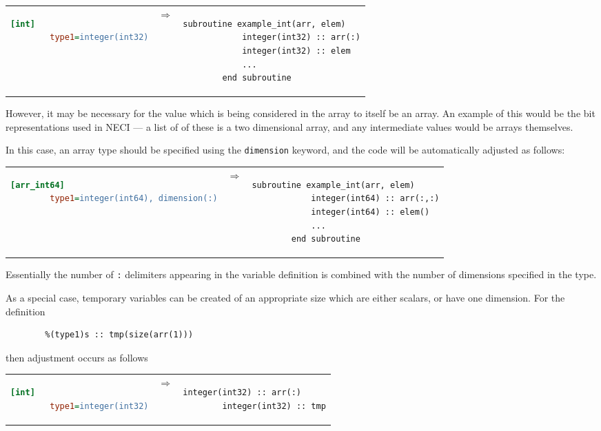 \documentclass[a4paper,notitlepage]{scrreprt}
\let\code\lstinline
\begin{document}
{{	\begin{center}
	\begin{tabular}{lcl}
	\begin{lstlisting}[language=ini,gobble=8]
		[int]
		type1=integer(int32)
	\end{lstlisting}

	& $\Longrightarrow$ &

	\begin{lstlisting}[gobble=8]
		subroutine example_int(arr, elem)
			integer(int32) :: arr(:)
			integer(int32) :: elem
			...
		end subroutine
	\end{lstlisting}
	\end{tabular}
	\end{center}

	However, it may be necessary for the value which is being considered in
	the array to itself be an array. An example of this would be the bit
	representations used in NECI --- a list of of these is a two dimensional
	array, and any intermediate values would be arrays themselves.

	In this case, an array type should be specified using the \code{dimension}
	keyword, and the code will be automatically adjusted as follows:

	\begin{tabular}{lcl}
	\begin{lstlisting}[language=ini,gobble=8]
		[arr_int64]
		type1=integer(int64), dimension(:)
	\end{lstlisting}

	& $\Longrightarrow$ &

	\begin{lstlisting}[gobble=8]
		subroutine example_int(arr, elem)
			integer(int64) :: arr(:,:)
			integer(int64) :: elem()
			...
		end subroutine
	\end{lstlisting}
	\end{tabular}

	Essentially the number of \code{:} delimiters appearing in the variable
	definition is combined with the number of dimensions specified in the type.

	As a special case, temporary variables can be created of an appropriate
	size which are either scalars, or have one dimension. For the definition
	\begin{lstlisting}[gobble=4]
		%(type1)s :: arr(:)
		%(type1)s :: tmp(size(arr(1)))
	\end{lstlisting}
	then adjustment occurs as follows

	\begin{tabular}{lcl}
	\begin{lstlisting}[language=ini,gobble=8]
		[int]
		type1=integer(int32)
	\end{lstlisting}
	& $\Longrightarrow$ &
	\begin{lstlisting}[gobble=8]
		integer(int32) :: arr(:)
		integer(int32) :: tmp
	\end{lstlisting} \\[1.5em]


\end{tabular}}}
\end{document}
